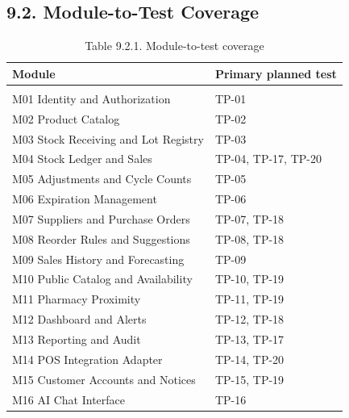 \subsection{9.2. Module-to-Test Coverage}\label{module-to-test-coverage}

{\def\LTcaptype{none} %
\begin{longtable}[]{|
  >{\raggedright\arraybackslash}m{}|
  >{\raggedright\arraybackslash}m{}|}
\hline
\begin{minipage}[c]{\linewidth}\raggedright
\textbf{Module}
\end{minipage} & \begin{minipage}[c]{\linewidth}\raggedright
\textbf{Primary planned test}
\end{minipage} \\
\hline
\endhead

\caption*{Table 9.2.1. Module-to-test coverage}\\
\endlastfoot
M01 Identity and Authorization & TP-01 \\ \hline
M02 Product Catalog & TP-02 \\ \hline
M03 Stock Receiving and Lot Registry & TP-03 \\ \hline
M04 Stock Ledger and Sales & TP-04, TP-17, TP-20 \\ \hline
M05 Adjustments and Cycle Counts & TP-05 \\ \hline
M06 Expiration Management & TP-06 \\ \hline
M07 Suppliers and Purchase Orders & TP-07, TP-18 \\ \hline
M08 Reorder Rules and Suggestions & TP-08, TP-18 \\ \hline
M09 Sales History and Forecasting & TP-09 \\ \hline
M10 Public Catalog and Availability & TP-10, TP-19 \\ \hline
M11 Pharmacy Proximity & TP-11, TP-19 \\ \hline
M12 Dashboard and Alerts & TP-12, TP-18 \\ \hline
M13 Reporting and Audit & TP-13, TP-17 \\ \hline
M14 POS Integration Adapter & TP-14, TP-20 \\ \hline
M15 Customer Accounts and Notices & TP-15, TP-19 \\ \hline
M16 AI Chat Interface & TP-16 \\ \hline
\end{longtable}
}

